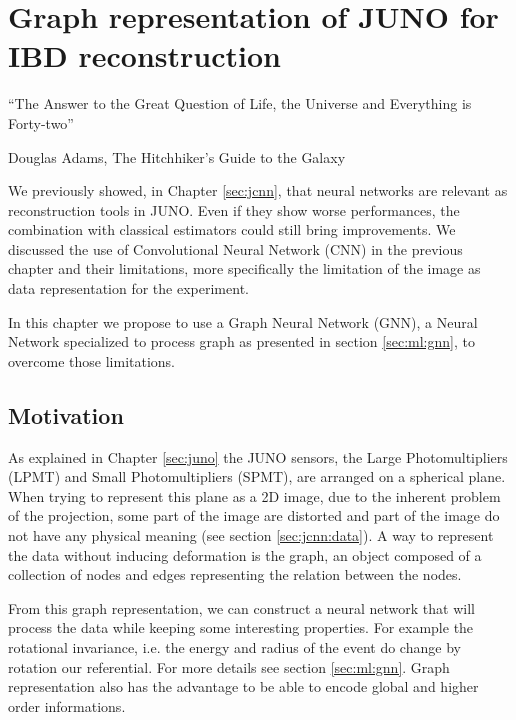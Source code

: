 \documentclass[../main.tex]{subfiles}
\begin{document}
\chapter{Graph representation of JUNO for IBD reconstruction}
\label{sec:jgnn}
\epigraph{``The Answer to the Great Question of Life, the Universe and Everything is Forty-two''}{Douglas Adams, The Hitchhiker’s Guide to the Galaxy}

\minitoc

We previously showed, in Chapter \ref{sec:jcnn}, that neural networks are relevant as reconstruction tools in JUNO. Even if they show worse performances, the combination with classical estimators could still bring improvements. We discussed the use of Convolutional Neural Network (CNN) in the previous chapter and their limitations, more specifically the limitation of the image as data representation for the experiment.

In this chapter we propose to use a Graph Neural Network (GNN), a Neural Network specialized to process graph as presented in section \ref{sec:ml:gnn}, to overcome those limitations.

\section{Motivation}
\label{sec:jgnn:motiv}

As explained in Chapter \ref{sec:juno} the JUNO sensors, the Large Photomultipliers (LPMT) and Small Photomultipliers (SPMT), are arranged on a spherical plane. When trying to represent this plane as a 2D image, due to the inherent problem of the projection, some part of the image are distorted and part of the image do not have any physical meaning (see section  \ref{sec:jcnn:data}). A way to represent the data without inducing deformation is the graph, an object composed of a collection of nodes and edges representing the relation between the nodes.

From this graph representation, we can construct a neural network that will process the data while keeping some interesting properties. For example the rotational invariance, i.e. the energy and radius of the event do change by rotation our referential. For more details see section \ref{sec:ml:gnn}. Graph representation also has the advantage to be able to encode global and higher order informations.
\end{document}
